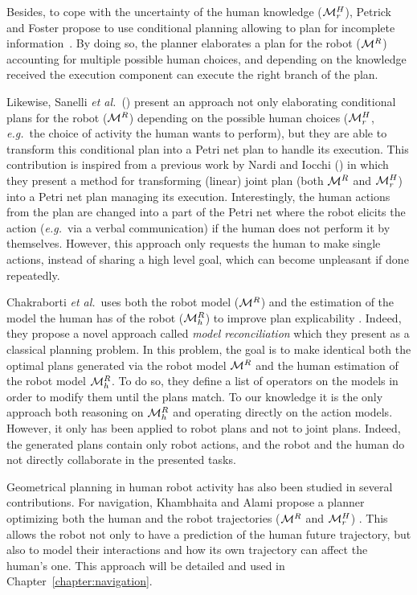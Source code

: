 \documentclass[a4paper,11pt,twoside]{StyleThese}
\begin{document}
Besides, to cope with the uncertainty of the human knowledge ($\mathcal{M}^H_r$), Petrick and Foster propose to use conditional planning allowing to plan for incomplete information~\cite{petrick2013planning}. By doing so, the planner elaborates a plan for the robot ($\mathcal{M}^R$) accounting for multiple possible human choices, and depending on the knowledge received the execution component can execute the right branch of the plan.

Likewise, Sanelli \textit{et al.}~(\cite{sanelli2017short}) present an approach not only elaborating conditional plans for the robot ($\mathcal{M}^R$)  depending on the possible human choices ($\mathcal{M}^H_r$, \textit{e.g.}~the choice of activity the human wants to perform), but they are able to transform this conditional plan into a Petri net plan to handle its execution. This contribution is inspired from a previous work by Nardi and Iocchi (\cite{nardi2014representation}) in which they present a method for transforming (linear) joint plan (both $\mathcal{M}^R$ and $\mathcal{M}^H_r$) into a Petri net plan managing its execution. Interestingly, the human actions from the plan are changed into a part of the Petri net where the robot elicits the action (\textit{e.g.}~via a verbal communication) if the human does not perform it by themselves. However, this approach only requests the human to make single actions, instead of sharing a high level goal, which can become unpleasant if done repeatedly. 

Chakraborti \textit{et al.}~uses both the robot model ($\mathcal{M}^R$) and the estimation of the model the human has of the robot ($\mathcal{M}^R_h$) to improve plan explicability \cite{chakraborti2017plan}. Indeed, they propose a novel approach called \textit{model reconciliation} which they present as a classical planning problem. In this problem, the goal is to make identical both the optimal plans generated via the robot model $\mathcal{M}^R$ and the human estimation of the robot model $\mathcal{M}^R_h$. To do so, they define a list of operators on the models in order to modify them until the plans match. To our knowledge it is the only approach both reasoning on $\mathcal{M}^R_h$ and operating directly on the action models. However, it only has been applied to robot plans and not to joint plans. Indeed, the generated plans contain only robot actions, and the robot and the human do not directly collaborate in the presented tasks.

\medskip
Geometrical planning in human robot activity has also been studied in several contributions. For navigation, Khambhaita and Alami propose a planner optimizing both the human and the robot trajectories ($\mathcal{M}^R$ and $\mathcal{M}^H_r$) \cite{khambhaita_viewing_2017}. This allows the robot not only to have a prediction of the human future trajectory, but also to model their interactions and how its own trajectory can affect the human's one. This approach will be detailed and used in Chapter~\ref{chapter:navigation}.
\end{document}
